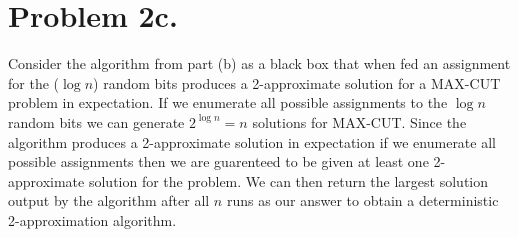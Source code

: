 \documentclass[12pt]{article}
\begin{document}
\section*{Problem 2c.}
Consider the algorithm from part (b) as a black box that when fed an
assignment for the ($\log n$) random bits produces a 2-approximate solution for
a MAX-CUT problem in expectation. If we enumerate all possible assignments to
the $\log n$ random bits we can generate $2^{\log n} = n$ solutions for MAX-CUT.
Since the algorithm produces a 2-approximate solution in expectation if we
enumerate all possible assignments then we are guarenteed to be given at least
one 2-approximate solution for the problem. We can then return the largest
solution output by the algorithm after all $n$ runs as our answer to obtain a
deterministic 2-approximation algorithm.
\end{document}

